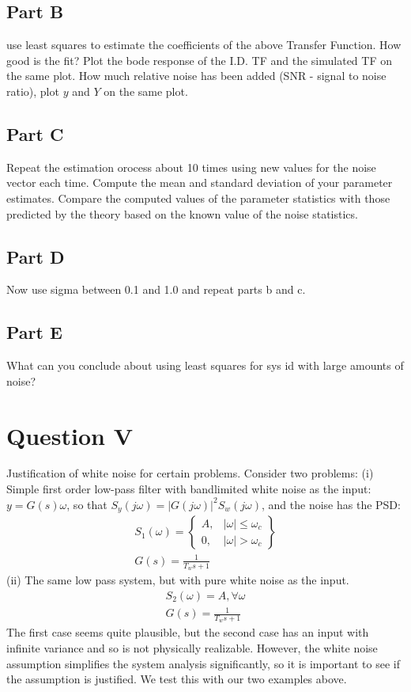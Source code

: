 \documentclass{article}
\begin{document}
\subsection*{Part B}
use least squares to estimate the coefficients of the above Transfer Function.  How good is the fit? Plot the bode response of the I.D. TF 
and the simulated TF on the same plot.  How much relative noise has been added (SNR - signal to noise ratio), plot $y$ and $Y$ on the same plot.
\subsection*{Part C}
Repeat the estimation orocess about 10 times using new values for the noise vector each time.  Compute the mean and standard deviation of your 
parameter estimates.  Compare the computed values of the parameter statistics with those predicted by the theory based on the known value of 
the noise statistics.
\subsection*{Part D}
Now use sigma between 0.1 and 1.0 and repeat parts b and c.
\subsection*{Part E}
What can you conclude about using least squares for sys id with large amounts of noise?

\section*{Question V}
Justification of white noise for certain problems. Consider two problems: (i) Simple first order low-pass filter with bandlimited white noise as the input:\\
$y = G(s)\omega$, so that $S_y(j\omega) = |G(j\omega)|^2 S_w(j\omega)$, and the noise has the PSD:
\begin{gather*}
    S_1(\omega) = \left\{
                    \begin{array}{lr}
                        A, & |\omega|\leq\omega_c\\
                        0, & |\omega|>\omega_c
                    \end{array}
                \right\}\\
    G(s)=\frac{1}{T_ws+1}
\end{gather*}
(ii) The same low pass system, but with pure white noise as the input.
\begin{gather*}
    S_2(\omega)=A,\forall\omega\\
    G(s)=\frac{1}{T_ws+1}
\end{gather*}
The first case seems quite plausible, but the second case has an input with infinite variance and so is not physically realizable.  However, the white noise 
assumption simplifies the system analysis significantly, so it is important to see if the assumption is justified.  We test this with our two examples above.
\end{document}
